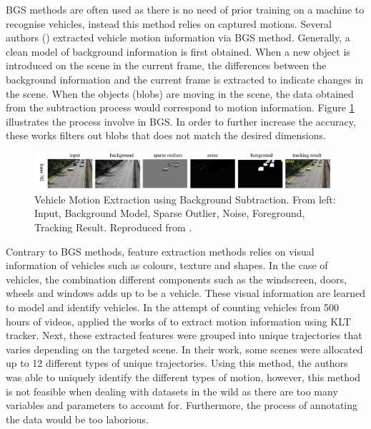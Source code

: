 BGS methods are often used as there is no need of prior training on a machine to recognise vehicles, instead this method relies on captured motions.
Several authors () extracted vehicle motion information via BGS method. Generally, a clean model of background information is first obtained. When a new object is introduced on the scene in the current frame, the differences between the background information and the current frame is extracted to indicate changes in the scene. When the objects (blobs) are moving in the scene, the data obtained from the subtraction process would correspond to motion information. Figure \ref{fig:bgs2} illustrates the process involve in BGS. In order to further increase the accuracy, these works filters out blobs that does not match the desired dimensions. 

\begin{figure}[hbt!]\centering
\includegraphics[width=1\textwidth]{image/lit/bgs.PNG}
\caption[Vehicle Motion Extraction using Background Subtraction. From left: Input, Background Model, Sparse Outlier, Noise, Foreground, Tracking Result]
{Vehicle Motion Extraction using Background Subtraction. From left: Input, Background Model, Sparse Outlier, Noise, Foreground, Tracking Result.
Reproduced from .}
\label{fig:bgs2}
\end{figure}

Contrary to BGS methods, feature extraction methods relies on visual information of vehicles such as colours, texture and shapes. In the case of vehicles, the combination different components such as the windscreen, doors, wheels and windows adds up to be a vehicle. These visual information are learned to model and identify vehicles.
In the attempt of counting vehicles from 500 hours of videos,  applied the works of  to extract motion information using KLT tracker. Next, these extracted features were grouped into unique trajectories that varies depending on the targeted scene. In their work, some scenes were allocated up to 12 different types of unique trajectories. Using this method, the authors was able to uniquely identify the different types of motion, however, this method is not feasible when dealing with  datasets in the wild as there are too many variables and parameters to account for. Furthermore, the process of annotating the data would be too laborious. 

